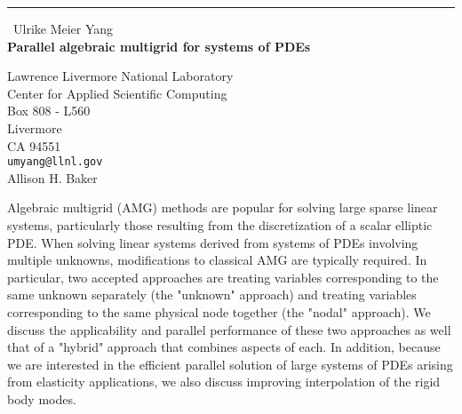 \documentclass{report}
\begin{document}
\begin{center}
\rule{6in}{1pt} \
{\large Ulrike Meier Yang \\
{\bf Parallel algebraic multigrid for systems of PDEs }}

Lawrence Livermore National Laboratory \\ Center for Applied Scientific Computing \\ Box 808 - L560 \\ Livermore \\ CA 94551
\\
{\tt umyang@llnl.gov}\\
Allison H. Baker\end{center}

Algebraic multigrid (AMG) methods are popular for solving large sparse
linear systems, particularly those resulting from the discretization of a
scalar elliptic PDE. When solving linear systems derived from systems of
PDEs involving multiple unknowns, modifications to classical AMG are
typically required. In particular, two accepted approaches are treating
variables corresponding to the same unknown separately (the "unknown"
approach) and treating variables corresponding to the same physical node
together (the "nodal" approach). We discuss the applicability and
parallel performance of these two approaches as well that of a "hybrid"
approach that combines aspects of each. In addition, because we are
interested in the efficient parallel solution of large systems of PDEs
arising from elasticity applications, we also discuss improving
interpolation of the rigid body modes.
\end{document}
